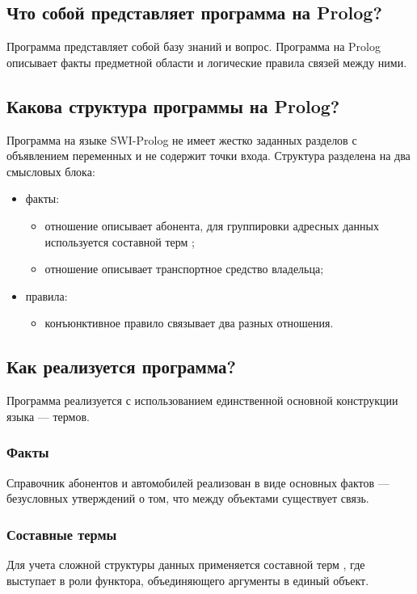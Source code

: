 \subsection{Что собой представляет программа на Prolog?}
Программа представляет собой базу знаний и вопрос. Программа на Prolog описывает факты 
предметной области и логические правила связей между ними.

\subsection{Какова структура программы на Prolog?}
Программа на языке SWI-Prolog не имеет жестко заданных разделов с объявлением переменных и не 
содержит точки входа. Структура разделена на два смысловых блока:
\begin{itemize}
    \item факты:
    \begin{itemize}
        \item отношение  описывает абонента, для группировки адресных данных 
        используется составной терм ;
        \item отношение  описывает транспортное средство владельца;
    \end{itemize}
    \item правила:
    \begin{itemize}
        \item конъюнктивное правило  связывает два разных отношения.
    \end{itemize}
\end{itemize}

\subsection{Как реализуется программа?}
Программа реализуется с использованием единственной основной конструкции языка --- термов.
\subsubsection{Факты}
Справочник абонентов и автомобилей реализован в виде основных фактов --- безусловных утверждений о том, 
что между объектами существует связь.

\subsubsection{Составные термы}
Для учета сложной структуры данных применяется составной терм , 
где  выступает в роли функтора, объединяющего аргументы в единый объект.

